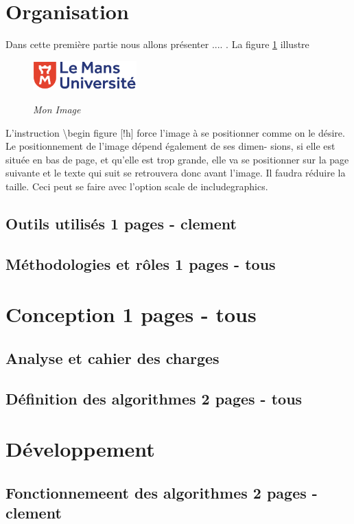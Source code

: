 \documentclass[10pt]{article}
\begin{document}
\section{Organisation }   
Dans cette première partie nous allons présenter .... . La figure \ref{fig1} illustre
\begin{figure}[h]
   \begin{center}
      \includegraphics[width=4cm]{logolemansU.png}\\
      \caption{{\emph{Mon Image}}}
      \label{fig1}
   \end{center}
\end{figure}


L’instruction \textbackslash begin figure [!h] force l’image à se positionner comme
on le désire. Le positionnement de l’image dépend également de ses dimen-
sions, si elle est située en bas de page, et qu’elle est trop grande, elle va se
positionner sur la page suivante et le texte qui suit se retrouvera donc avant
l’image. Il faudra réduire la taille. Ceci peut se faire avec l’option scale de
includegraphics.
      \subsection{Outils utilisés 1 pages - clement}
      \subsection{Méthodologies et rôles 1 pages - tous}

\section{Conception 1 pages - tous}
   \subsection{Analyse et cahier des charges}
   \subsection{Définition des algorithmes 2 pages - tous}

\section{Développement}
   \subsection{Fonctionnemeent des algorithmes 2 pages - clement}
\end{document}
